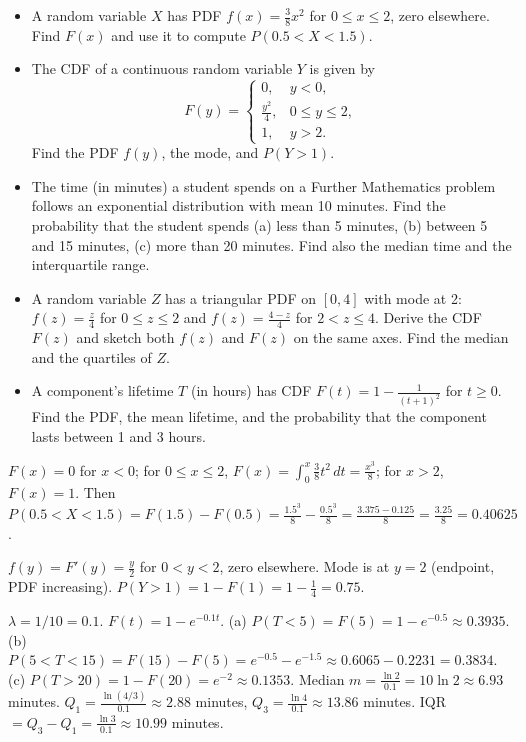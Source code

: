 \documentclass[11pt]{article}
\begin{document}
\begin{exercice}
\begin{itemize}
\item A random variable \(X\) has PDF \(f(x) = \frac{3}{8}x^2\) for \(0 \le x \le 2\), zero elsewhere. Find \(F(x)\) and use it to compute \(P(0.5 < X < 1.5)\).
\item The CDF of a continuous random variable \(Y\) is given by
\[
F(y) = \begin{cases}
0, & y < 0,\\
\frac{y^2}{4}, & 0 \le y \le 2,\\
1, & y > 2.
\end{cases}
\]
Find the PDF \(f(y)\), the mode, and \(P(Y > 1)\).
\item The time (in minutes) a student spends on a Further Mathematics problem follows an exponential distribution with mean 10 minutes. Find the probability that the student spends (a) less than 5 minutes, (b) between 5 and 15 minutes, (c) more than 20 minutes. Find also the median time and the interquartile range.
\item A random variable \(Z\) has a triangular PDF on \([0,4]\) with mode at 2: \(f(z) = \frac{z}{4}\) for \(0\le z\le 2\) and \(f(z) = \frac{4-z}{4}\) for \(2<z\le 4\). Derive the CDF \(F(z)\) and sketch both \(f(z)\) and \(F(z)\) on the same axes. Find the median and the quartiles of \(Z\).
\item A component's lifetime \(T\) (in hours) has CDF \(F(t) = 1 - \frac{1}{(t+1)^2}\) for \(t \ge 0\). Find the PDF, the mean lifetime, and the probability that the component lasts between 1 and 3 hours.
\end{itemize}
\end{exercice}

\begin{corrige}[Exercise 1]
\(F(x) = 0\) for \(x<0\); for \(0\le x\le 2\), \(F(x) = \int_0^x \frac{3}{8}t^2\,dt = \frac{x^3}{8}\); for \(x>2\), \(F(x)=1\). Then \(P(0.5<X<1.5) = F(1.5)-F(0.5) = \frac{1.5^3}{8} - \frac{0.5^3}{8} = \frac{3.375 - 0.125}{8} = \frac{3.25}{8} = 0.40625\).
\end{corrige}

\begin{corrige}[Exercise 2]
\(f(y) = F'(y) = \frac{y}{2}\) for \(0<y<2\), zero elsewhere. Mode is at \(y=2\) (endpoint, PDF increasing). \(P(Y>1) = 1 - F(1) = 1 - \frac{1}{4} = 0.75\).
\end{corrige}

\begin{corrige}[Exercise 3]
\(\lambda = 1/10 = 0.1\). \(F(t) = 1 - e^{-0.1t}\).
(a) \(P(T<5) = F(5) = 1 - e^{-0.5} \approx 0.3935\).
(b) \(P(5<T<15) = F(15)-F(5) = e^{-0.5} - e^{-1.5} \approx 0.6065 - 0.2231 = 0.3834\).
(c) \(P(T>20) = 1 - F(20) = e^{-2} \approx 0.1353\).
Median \(m = \frac{\ln 2}{0.1} = 10\ln 2 \approx 6.93\) minutes.
\(Q_1 = \frac{\ln(4/3)}{0.1} \approx 2.88\) minutes, \(Q_3 = \frac{\ln 4}{0.1} \approx 13.86\) minutes.
IQR \(= Q_3 - Q_1 = \frac{\ln 3}{0.1} \approx 10.99\) minutes.
\end{corrige}
\end{document}

